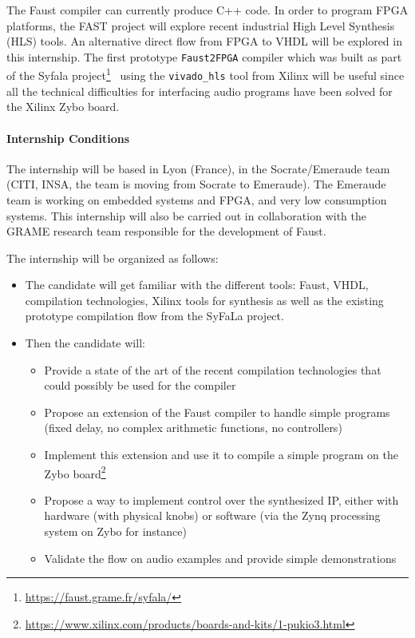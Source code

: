 \documentclass[a4paper,francais,11]{article}
\begin{document}
The Faust compiler can currently produce C++ code. In order to program FPGA platforms, the FAST project will explore recent industrial High Level Synthesis (HLS) tools. An alternative direct flow from FPGA to VHDL will  be explored in this internship. The  first prototype {\tt Faust2FPGA} compiler which was built as part of the Syfala project\footnote{\url{https://faust.grame.fr/syfala/}}~\cite{risset2020} using the {\tt vivado\_hls} tool from Xilinx will be useful since all the technical difficulties for interfacing audio programs have been solved for the Xilinx Zybo board.



\paragraph{Internship Conditions}
The internship will be based in Lyon (France), in the Socrate/Emeraude team (CITI, INSA, the team is moving from Socrate to Emeraude). The Emeraude team is working on embedded systems and FPGA, and very low consumption systems. This internship will also be carried out in collaboration with the GRAME research team responsible for the development of Faust. 

The internship will be organized as follows:
\begin{itemize}
\item  The candidate will get familiar with the different tools: Faust, VHDL, compilation technologies, Xilinx tools for synthesis as well as the existing prototype compilation flow from the SyFaLa project.
\item  Then the  candidate will:
  \begin{itemize}
    \item Provide a state of the art of the recent compilation technologies that could possibly be used for the compiler
    \item Propose an extension of the Faust compiler to handle simple programs
       (fixed delay, no complex arithmetic functions, no controllers)
    \item Implement this extension and use it to compile a simple program on the Zybo board\footnote{\url{https://www.xilinx.com/products/boards-and-kits/1-pukio3.html}}
  \item Propose a way to implement control over the synthesized IP, either with hardware (with physical knobs) or software (via the Zynq processing system on Zybo for instance)
  \item Validate the flow on audio examples and provide simple demonstrations
  \end{itemize}
\end{itemize}
\end{document}
